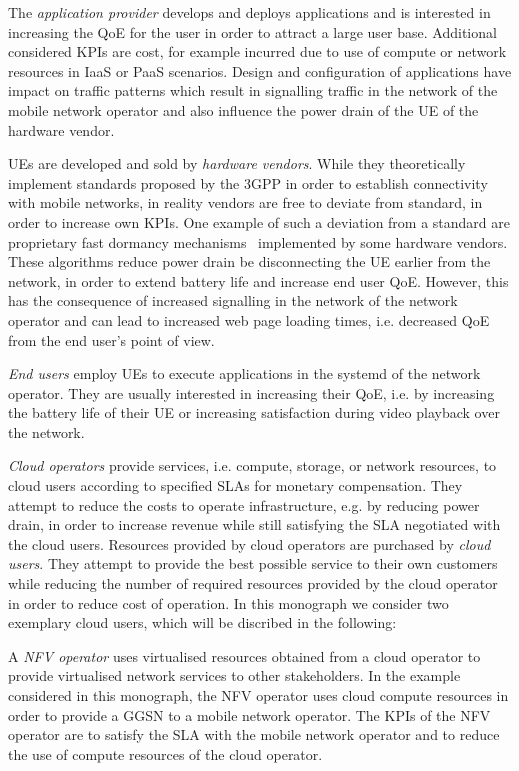 The \emph{application provider} develops and deploys applications and is interested in increasing the \gls{QoE} for the user in order to attract a large user base.
Additional considered \glspl{KPI} are cost, for example incurred due to use of compute or network resources in \gls{IaaS} or \gls{PaaS} scenarios.
Design and configuration of applications have impact on traffic patterns which result in signalling traffic in the network of the mobile network operator and also influence the power drain of the \gls{UE} of the hardware vendor.


\glspl{UE} are developed and sold by \emph{hardware vendors}.
While they theoretically implement standards proposed by the \gls{3GPP} in order to establish connectivity with mobile networks, in reality vendors are free to deviate from standard, in order to increase own \glspl{KPI}.
One example of such a deviation from a standard are proprietary fast dormancy mechanisms~\cite{GSM2010} implemented by some hardware vendors.
These algorithms reduce power drain be disconnecting the \gls{UE} earlier from the network, in order to extend battery life and increase end user \gls{QoE}.
However, this has the consequence of increased signalling in the network of the network operator and can lead to increased web page loading times, i.e. decreased \gls{QoE} from the end user's point of view.

\emph{End users} employ \glspl{UE} to execute applications in the systemd of the network operator. 
They are usually interested in increasing their \gls{QoE}, i.e. by increasing the battery life of their \gls{UE} or increasing satisfaction during video playback over the network.

\emph{Cloud operators} provide services, i.e. compute, storage, or network resources, to cloud users according to specified \glspl{SLA} for monetary compensation. 
They attempt to reduce the costs to operate infrastructure, e.g. by reducing power drain, in order to increase revenue while still satisfying the \gls{SLA} negotiated with the cloud users.
Resources provided by cloud operators are purchased by \emph{cloud users}.
They attempt to provide the best possible service to their own customers while reducing the number of required resources provided by the cloud operator in order to reduce cost of operation. In this monograph we consider two exemplary cloud users, which will be discribed in the following:

A \emph{\gls{NFV} operator} uses virtualised resources obtained from a cloud operator to provide virtualised network services to other stakeholders.
In the example considered in this monograph, the \gls{NFV} operator uses cloud compute resources in order to provide a \gls{GGSN} to a mobile network operator.
The \glspl{KPI} of the \gls{NFV} operator are to satisfy the \gls{SLA} with the mobile network operator and to reduce the use of compute resources of the cloud operator.

